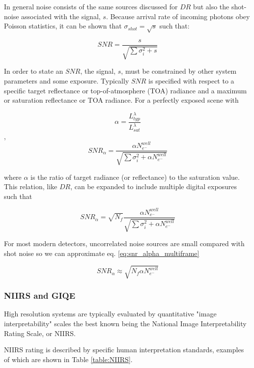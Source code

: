 \documentclass[10pt,journal]{IEEEtran}  %
\begin{document}
In general noise consists of the same sources discussed for $DR$ but also the shot-noise associated with the signal, $s$.  Because arrival rate of incoming photons obey Poisson statistics, it can be shown that $\sigma_{shot} = \sqrt{s}$ such that:

$$SNR = \frac{s}{\sqrt{\sum{\sigma_i^2} + s}}$$

In order to state an $SNR$, the signal, $s$, must be constrained by other system parameters and some exposure.  Typically $SNR$ is specified with respect to a specific target reflectance or top-of-atmosphere (TOA) radiance and a maximum or saturation reflectance or TOA radiance.  For a perfectly exposed scene with

$$\alpha = \frac{L_{typ}^\lambda}{L_{sat}^\lambda}$$
,
$$SNR_{\alpha} = \frac{\alpha N_{e^-}^{well}}{\sqrt{\sum{\sigma_i^2} + \alpha N_{e^-}^{well}}}$$

where $\alpha$ is the ratio of target radiance (or reflectance) to the saturation value.  This relation, like $DR$, can be expanded to include multiple digital exposures such that

\begin{equation}
\label{eq:snr_alpha_multiframe}
SNR_{\alpha} = \sqrt{N_f}\frac{\alpha N_{e^-}^{well}}{\sqrt{\sum{\sigma_i^2} + \alpha N_{e^-}^{well}}}
\end{equation}

For most modern detectors, uncorrelated noise sources are small compared with shot noise so we can approximate eq. \ref{eq:snr_alpha_multiframe}

\begin{equation}
\label{eq:snr_alpha_multiframe_simp}
SNR_{\alpha} \approx \sqrt{N_f \alpha N_{e^-}^{well}}
\end{equation}

\subsubsection{NIIRS and GIQE}
High resolution systems are typically evaluated by quantitative "image interpretability" scales the best known being the National Image Interpretability Rating Scale, or NIIRS.

NIIRS rating is described by specific human interpretation standards, examples of which are shown in Table \ref{table:NIIRS}\cite{niirs}.
\end{document}
